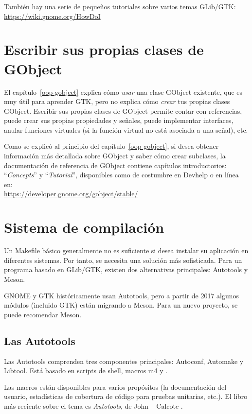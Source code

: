 También hay una serie de pequeños tutoriales sobre varios temas GLib/GTK: \\
\url{https://wiki.gnome.org/HowDoI}

\section{Escribir sus propias clases de GObject}

El capítulo~\ref{oop-gobject} explica cómo \emph{usar} una clase GObject existente, que es muy útil para aprender GTK, pero no explica cómo \emph{crear} tus propias clases GObject. Escribir sus propias clases de GObject permite contar con referencias, puede crear sus propias propiedades y señales, puede implementar interfaces, anular funciones virtuales (si la función virtual no está asociada a una señal), etc.

Como se explicó al principio del capítulo~\ref{oop-gobject}, si desea obtener información más detallada sobre GObject y saber cómo crear subclases, la documentación de referencia de GObject contiene capítulos introductorios: ``\emph{Concepts}'' y ``\emph{Tutorial}'', disponibles como de costumbre en Devhelp o en línea en: \\
\url{https://developer.gnome.org/gobject/stable/}

\section{Sistema de compilación}

Un Makefile básico generalmente no es suficiente si desea instalar su aplicación en diferentes sistemas. Por tanto, se necesita una solución más sofisticada. Para un programa basado en GLib/GTK, existen dos alternativas principales: Autotools y Meson.

GNOME y GTK históricamente usan Autotools, pero a partir de 2017 algunos módulos (incluido GTK) están migrando a Meson. Para un nuevo proyecto, se puede recomendar Meson.

\subsection{Las Autotools}

Las Autotools comprenden tres componentes principales: Autoconf, Automake y Libtool. Está basado en scripts de shell, macros m4 y .

Las macros están disponibles para varios propósitos (la documentación del usuario, estadísticas de cobertura de código para pruebas unitarias, etc.). El libro más reciente sobre el tema es \emph{Autotools}, de John ~ Calcote \cite{autotools}.

